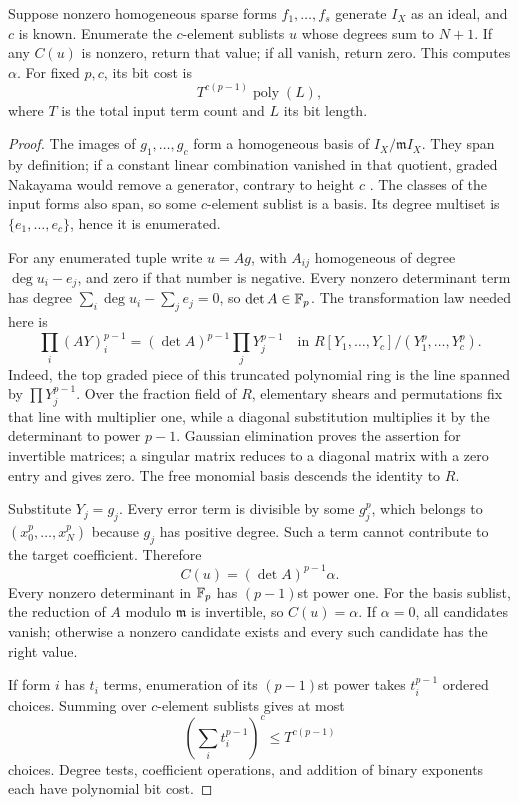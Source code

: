 \begin{theorem}
\label{sp:thm:generators}
Suppose nonzero homogeneous sparse forms $f_1,\ldots,f_s$ generate
$I_X$ as an ideal, and $c$ is known. Enumerate the $c$-element sublists
$u$ whose degrees sum to $N+1$. If any $C(u)$ is nonzero, return that
value; if all vanish, return zero. This computes $\alpha$.
For fixed $p,c$, its bit cost is
\[
 T^{c(p-1)}\operatorname{poly}(L),
\]
where $T$ is the total input term count and $L$ its bit length.
\end{theorem}
\begin{proof}
The images of $g_1,\ldots,g_c$ form a homogeneous basis of
$I_X/\mathfrak m I_X$. They span by definition; if a constant linear
combination vanished in that quotient, graded Nakayama would remove a
generator, contrary to height $c$
\citep[Lemma~10.56.1(4), tag~0EKB]{sp-stacks}.
The classes of the input forms also
span, so some $c$-element sublist is a basis. Its degree multiset is
$\{e_1,\ldots,e_c\}$, hence it is enumerated.

For any enumerated tuple write $u=Ag$, with $A_{ij}$ homogeneous of
degree $\deg u_i-e_j$, and zero if that number is negative. Every
nonzero determinant term has degree
$\sum_i\deg u_i-\sum_j e_j=0$, so $\det A\in\mathbb F_p$.
The transformation law needed here is
\begin{equation}
 \prod_i(AY)_i^{p-1}
   =(\det A)^{p-1}\prod_jY_j^{p-1}
 \quad\text{in }R[Y_1,\ldots,Y_c]/(Y_1^p,\ldots,Y_c^p).
 \label{sp:eq:determinant-law}
\end{equation}
Indeed, the top graded piece of this truncated polynomial ring is the
line spanned by $\prod Y_j^{p-1}$. Over the fraction field of $R$,
elementary shears and permutations fix that line with multiplier one,
while a diagonal substitution multiplies it by the determinant to
power $p-1$. Gaussian elimination proves the assertion for invertible
matrices; a singular matrix reduces to a diagonal matrix with a zero
entry and gives zero. The free monomial basis descends the identity
to $R$.

Substitute $Y_j=g_j$. Every error term is divisible by some $g_j^p$,
which belongs to $(x_0^p,\ldots,x_N^p)$ because $g_j$ has positive
degree. Such a term cannot contribute to the target coefficient.
Therefore
\[
 C(u)=(\det A)^{p-1}\alpha.
\]
Every nonzero determinant in $\mathbb F_p$ has $(p-1)$st power one. For the
basis sublist, the reduction of $A$ modulo $\mathfrak m$ is invertible,
so $C(u)=\alpha$. If $\alpha=0$, all candidates vanish; otherwise a
nonzero candidate exists and every such candidate has the right value.

If form $i$ has $t_i$ terms, enumeration of its $(p-1)$st power takes
$t_i^{p-1}$ ordered choices. Summing over $c$-element sublists gives at
most
\[
 \left(\sum_i t_i^{p-1}\right)^c\leq T^{c(p-1)}
\]
choices. Degree tests, coefficient operations, and addition of binary
exponents each have polynomial bit cost.
\end{proof}

